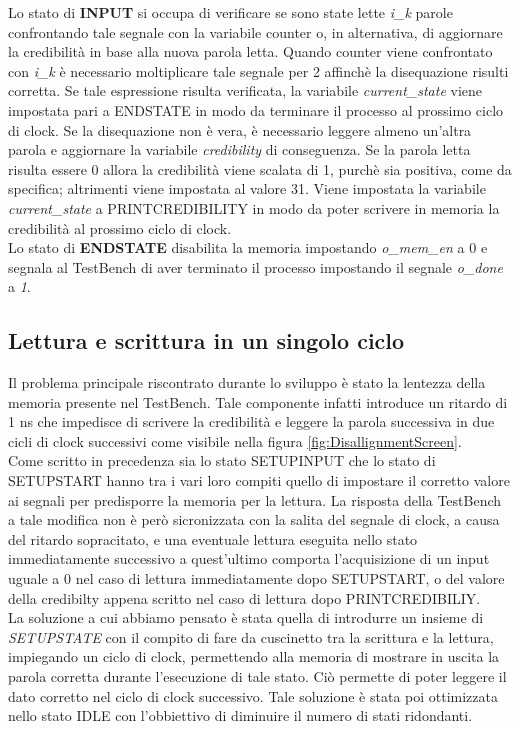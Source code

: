 \documentclass[12pt]{article}
\begin{document}
Lo stato di \textbf{INPUT} si occupa di verificare se sono state lette \textit{i\_k} parole confrontando tale segnale con la variabile counter o, in alternativa, di aggiornare la credibilità in base alla nuova parola letta. 
Quando counter viene confrontato con \textit{i\_k} è necessario moltiplicare tale segnale per 2 affinchè la disequazione risulti corretta. Se tale espressione risulta verificata, la variabile \textit{current\_state} viene impostata pari a ENDSTATE in modo da terminare il processo al prossimo ciclo di clock. Se la disequazione non è vera, è necessario leggere almeno un'altra parola e aggiornare la variabile \textit{credibility} di conseguenza. Se la parola letta risulta essere 0 allora la credibilità viene scalata di 1, purchè sia positiva, come da specifica; altrimenti viene impostata al valore 31. Viene impostata la variabile \textit{current\_state} a PRINTCREDIBILITY in modo da poter scrivere in memoria la credibilità al prossimo ciclo di clock.\\

Lo stato di \textbf{ENDSTATE} disabilita la memoria impostando \textit{o\_mem\_en} a 0 e segnala al TestBench di aver terminato il processo impostando il segnale \textit{o\_done} a \textit{1}. \\

\subsection{Lettura e scrittura in un singolo ciclo}
\label{SingleReading}
Il problema principale riscontrato durante lo sviluppo è stato la lentezza della memoria presente nel TestBench. Tale componente infatti introduce un ritardo di 1 ns che impedisce di scrivere la credibilità e leggere la parola successiva in due cicli di clock successivi come visibile nella figura \ref{fig:DisallignmentScreen}. \\
Come scritto in precedenza sia lo stato SETUPINPUT che lo stato di SETUPSTART hanno tra i vari loro compiti quello di impostare il corretto valore ai segnali per predisporre la memoria per la lettura. La risposta della TestBench a tale modifica non è però sicronizzata con la salita del segnale di clock, a causa del ritardo sopracitato, e una eventuale lettura eseguita nello stato immediatamente successivo a quest'ultimo comporta l'acquisizione di un input uguale a 0 nel caso di lettura immediatamente dopo SETUPSTART, o del valore della credibilty appena scritto nel caso di lettura dopo PRINTCREDIBILIY.\\
La soluzione a cui abbiamo pensato è stata quella di introdurre un insieme di \textit{SETUPSTATE} con il compito di fare da cuscinetto tra la scrittura e la lettura, impiegando un ciclo di clock, permettendo alla memoria di mostrare in uscita la parola corretta durante l'esecuzione di tale stato. Ciò permette di poter leggere il dato corretto nel ciclo di clock successivo. Tale soluzione è stata poi ottimizzata nello stato IDLE con l'obbiettivo di diminuire il numero di stati ridondanti.
\end{document}
